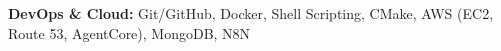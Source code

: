 \textbf{DevOps \& Cloud:} Git/GitHub, Docker, Shell Scripting, CMake, AWS (EC2, Route 53, AgentCore), MongoDB, N8N

